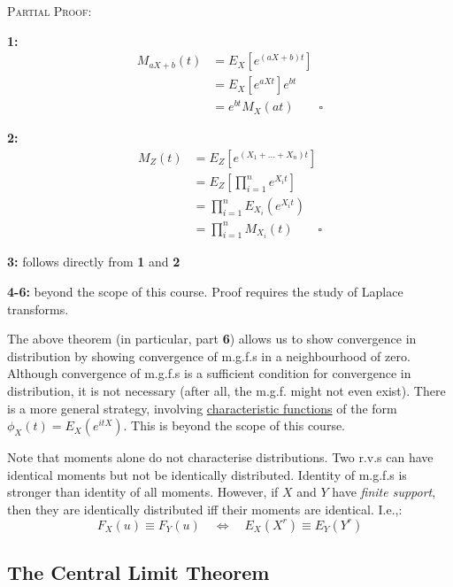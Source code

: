 \documentclass[12pt,a4paper]{article}
\begin{document}
\noindent\textsc{Partial Proof:}\par\vspace{1cm}

{\bf 1: }
\begin{align*}
M_{aX+b}(t) &= E_X\left[e^{(aX+b)t}\right]\\
&= E_X\left[e^{aXt}\right]e^{bt}\\
&= e^{bt}M_X(at)\qquad\square
\end{align*}

{\bf 2: }
\begin{align*}
M_Z(t) &= E_Z\left[e^{\left(X_1+\hdots + X_n\right) t}\right]\\
&= E_Z\left[\prod_{i=1}^n e^{X_i t}\right]\\
&= \prod_{i=1}^n E_{X_i}\left(e^{X_it}\right)\\
&= \prod_{i=1}^n M_{X_i}(t)\qquad\square
\end{align*}

{\bf 3: } follows directly from {\bf 1} and {\bf 2}\par\vspace{1cm}

{\bf 4-6:} beyond the scope of this course. Proof requires the study of Laplace transforms.\par\vspace{1cm}

The above theorem (in particular, part {\bf 6}) allows us to show convergence in distribution by showing convergence of m.g.f.s in a neighbourhood of zero. Although convergence of m.g.f.s is a sufficient condition for convergence in distribution, it is not necessary (after all, the m.g.f. might not even exist). There is a more general strategy, involving \underline{characteristic functions} of the form $\phi_X(t) = E_X\left(e^{itX}\right)$. This is beyond the scope of this course.

Note that moments alone do not characterise distributions. Two r.v.s can have identical moments but not be identically distributed. Identity of m.g.f.s is stronger than identity of all moments. However, if $X$ and $Y$ have \emph{finite support}, then they are identically distributed iff their moments are identical. I.e.,:
$$F_X(u) \equiv F_Y(u)\quad\Leftrightarrow\quad E_X(X^r) \equiv E_Y(Y^r)$$

\subsection{The Central Limit Theorem}$\;$
\end{document}
